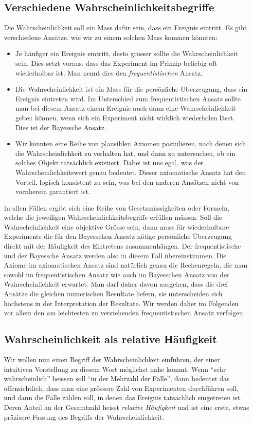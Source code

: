 \subsection{Verschiedene Wahrscheinlichkeitsbegriffe}
Die Wahrscheinlichkeit soll ein Mass dafür sein, dass ein Ereignis
eintritt.
Es gibt verschiedene Ansätze, wie wir zu einem solchen Mass kommen
könnten:
\begin{itemize}
\item 
Je häufiger ein Ereignis eintritt, desto grösser sollte die
Wahrscheinlichkeit sein.
Dies setzt voraus, dass das Experiment im Prinzip beliebig oft wiederholbar 
ist.
Man nennt dies den {\em frequentistischen} Ansatz.
\item
Die Wahrscheinlichkeit ist ein Mass für die persönliche
Überzeugung, dass ein Ereignis eintreten wird.
Im Unterschied zum frequentistischen Ansatz sollte man bei diesem
Ansatz einem Ereignis auch dann eine Wahrscheinlichkeit geben können,
wenn sich ein Experiment nicht wirklich wiederholen lässt.
Dies ist der Bayessche Ansatz.
\item
Wir könnten eine Reihe von plausiblen Axiomen postulieren, nach denen sich
die Wahrscheinlichkeit zu verhalten hat, und dann zu untersuchen,
ob ein solches Objekt tatsächlich existiert.
Dabei ist uns egal, was der Wahrscheinlichkeitswert genau bedeutet.
Dieser axiomatische Ansatz hat den Vorteil, logisch konsistent zu sein,
was bei den anderen Ansätzen nicht von vornherein garantiert ist.
\end{itemize}
In allen Fällen ergibt sich eine Reihe von Gesetzmässigkeiten
oder Formeln, welche die jeweiligen Wahrscheinlichkeitsbegriffe 
erfüllen müssen.
Soll die Wahrscheinlichkeit eine objektive Grösse sein, dann
muss für wiederholbare Experimente die für den Bayesschen
Ansatz nötige persönliche Überzeugung direkt mit der Häufigkeit
des Eintretens zusammenhängen.
Der frequentistische und der Bayessche Ansatz werden also in diesem
Fall übereinstimmen.
Die Axiome im axiomatischen Ansatz sind natürlich genau die
Rechenregeln, die man sowohl im frequentistischen Ansatz wie
auch im Bayesschen Ansatz von der Wahrscheinlichkeit erwartet.
Man darf daher davon ausgehen, dass die drei Ansätze die gleichen numerischen
Resultate liefern, sie unterscheiden sich höchstens in der Interpretation
der Resultate.
Wir werden daher im Folgenden vor allem den am leichtesten zu
verstehenden frequentistischen Ansatz verfolgen.

\subsection{Wahrscheinlichkeit als relative Häufigkeit}
Wir wollen nun einen Begriff der Wahrscheinlichkeit einführen, der
einer intuitiven Vorstellung zu diesem Wort möglichst nahe kommt.
Wenn ``sehr
wahrscheinlich'' heissen soll ``in der Mehrzahl der Fälle'', dann
bedeutet das offensichtlich, dass man eine grössere Zahl von
Experimenten durchführen soll, und dann die Fälle zählen soll,
in denen das Ereignis tatsächlich eingetreten ist.
Deren Anteil
an der Gesamtzahl heisst {\em relative Häufigkeit} und ist eine erste,
etwas präzisere Fassung des Begriffs der Wahrscheinlichkeit.

